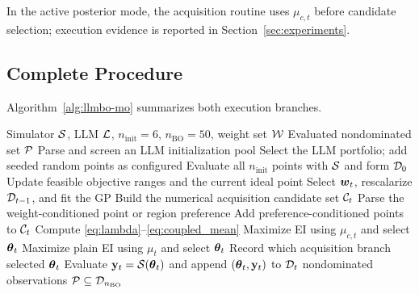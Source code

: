 In the active posterior mode, the acquisition routine uses $\mu_{c,t}$ before
candidate selection; execution evidence is reported in
Section~\ref{sec:experiments}.

\subsection{Complete Procedure}

Algorithm~\ref{alg:llmbo-mo} summarizes both execution branches.

\begin{algorithm}[!t]
\caption{LLMBO-MO with auditable preference modes}
\label{alg:llmbo-mo}
\begin{algorithmic}[1]
\Require Simulator $\mathcal{S}$, LLM $\mathcal{L}$, $n_{\mathrm{init}}=6$,
$n_{\mathrm{BO}}=50$, weight set $\mathcal{W}$
\Ensure Evaluated nondominated set $\mathcal{P}$
\State Parse and screen an LLM initialization pool
\State Select the LLM portfolio; add seeded random points as configured
\State Evaluate all $n_{\mathrm{init}}$ points with $\mathcal{S}$ and form $\mathcal{D}_0$
    \State Update feasible objective ranges and the current ideal point
    \State Select $\boldsymbol{w}_t$, rescalarize $\mathcal{D}_{t-1}$, and fit the GP
    \State Build the numerical acquisition candidate set $\mathcal{C}_t$
    \State Parse the weight-conditioned point or region preference
        \State Add preference-conditioned points to $\mathcal{C}_t$
    \EndIf
        \State Compute \eqref{eq:lambda}--\eqref{eq:coupled_mean}
        \State Maximize EI using $\mu_{c,t}$ and select $\boldsymbol{\theta}_t$
    \Else
        \State Maximize plain EI using $\mu_t$ and select $\boldsymbol{\theta}_t$
    \EndIf
    \State Record which acquisition branch selected $\boldsymbol{\theta}_t$
    \State Evaluate $\mathbf y_t=\mathcal{S}(\boldsymbol{\theta}_t)$ and append
    $(\boldsymbol{\theta}_t,\mathbf y_t)$ to $\mathcal{D}_t$
\EndFor
\State \Return nondominated observations $\mathcal{P}\subseteq\mathcal{D}_{n_{\mathrm{BO}}}$
\end{algorithmic}
\end{algorithm}
